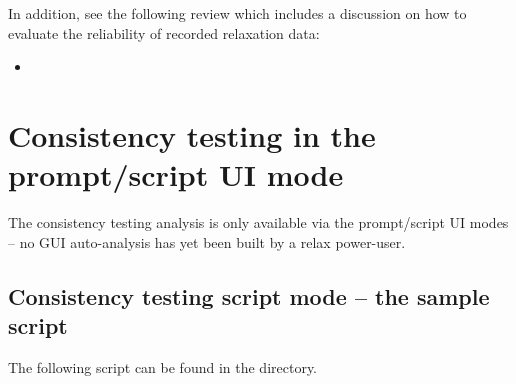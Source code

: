 In addition, see the following review which includes a discussion on how to evaluate the reliability of recorded relaxation data:
\begin{itemize}
  \item {}
\end{itemize}




\section{Consistency testing in the prompt/script UI mode}

The consistency testing analysis is only available via the prompt/script UI modes -- no GUI auto-analysis has yet been built by a relax power-user.



\subsection{Consistency testing script mode -- the sample script} \label{sect: consistency tests - sample script}

The following script can be found in the  directory.

